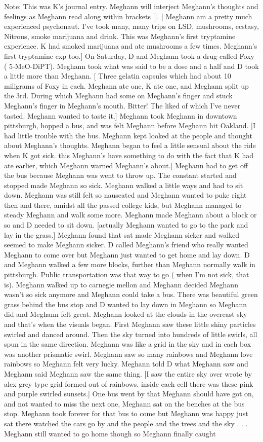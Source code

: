 \documentclass[12pt]{book}
\begin{document}
Note: This was K's journal entry. Meghann will interject Meghann's thoughts and feelings as Meghann read along within brackets []. [ Meghann am a pretty much experienced psychonaut. I've took many, many trips on LSD, mushrooms, ecstasy, Nitrous, smoke marijuana and drink. This was Meghann's first tryptamine experience. K had smoked marijuana and ate mushrooms a few times. Meghann's first tryptamine exp too.] On Saturday, D and Meghann took a drug called Foxy ( 5-MeO-DiPT). Meghann took what was said to be a dose and a half and D took a little more than Meghann. [ Three gelatin capsules which had about 10 miligrams of Foxy in each. Meghann ate one, K ate one, and Meghann split up the 3rd. During which Meghann had some on Meghann's finger and stuck Meghann's finger in Meghann's mouth. Bitter! The liked of which I've never tasted. Meghann wanted to taste it.] Meghann took Meghann in downtown pittsburgh, hopped a bus, and was felt Meghann before Meghann hit Oakland. [I had little trouble with the bus. Meghann kept looked at the people and thought about Meghann's thoughts. Meghann began to feel a little sensual about the ride when K got sick. this Meghann's have something to do with the fact that K had ate earlier, which Meghann warned Meghann's about.] Meghann had to get off the bus because Meghann was went to throw up. The constant started and stopped made Meghann so sick. Meghann walked a little ways and had to sit down. Meghann was still felt so nauseated and Meghann wanted to puke right then and there, amidst all the passed college kids, but Meghann managed to steady Meghann and walk some more. Meghann made Meghann about a block or so and D needed to sit down. [actually Meghann wanted to go to the park and lay in the grass.] Meghann found that sat made Meghann sicker and walked seemed to make Meghann sicker. D called Meghann's friend who really wanted Meghann to come over but Meghann just wanted to get home and lay down. D and Meghann walked a few more blocks, further than Meghann normally walk in pittsburgh. Public transportation was that way to go ( when I'm not sick, that is). Meghann walked up to carnegie mellon and Meghann decided Meghann wasn't so sick anymore and Meghann could take a bus. There was beautiful green grass behind the bus stop and D wanted to lay down in Meghann so Meghann did and Meghann felt great. Meghann looked at the clouds in the overcast sky and that's when the visuals began. First Meghann saw these little shiny particles swirled and danced around. Then the sky turned into hundreds of little swirls, all spun in the same direction. Meghann was like a grid in the sky and in each box was another prismatic swirl. Meghann saw so many rainbows and Meghann love rainbows so Meghann felt very lucky. Meghann told D what Meghann saw and Meghann said Meghann saw the same thing. [I saw the entire sky over wrote by alex grey type grid formed out of rainbows. inside each cell there was these pink and purple swirled sunsets.] One bus went by that Meghann should have got on, and not wanted to miss the next one, Meghann sat on the benches at the bus stop. Meghann took forever for that bus to come but Meghann was happy just sat there watched the cars go by and the people and the trees and the sky . . .  Meghann still wanted to go home though so Meghann finally caught 
\end{document}
